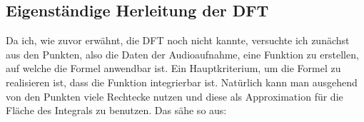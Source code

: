 \documentclass[a4paper,12pt]{article}
\theoremstyle{definition}
\theoremstyle{remark}
\begin{document}
\subsection{Eigenständige Herleitung der DFT}
Da ich, wie zuvor erwähnt, die DFT noch nicht kannte, versuchte ich zunächst aus den Punkten, 
also die Daten der Audioaufnahme, eine Funktion zu erstellen, auf welche die Formel anwendbar 
ist. Ein Hauptkriterium, um die Formel zu realisieren ist, dass die Funktion integrierbar ist. 
Natürlich kann man ausgehend von den Punkten viele Rechtecke nutzen und diese als Approximation 
für die Fläche des Integrals zu benutzen. Das sähe so aus:

\begin{figure}[h!]
\centering
{}
  \end{figure}
\end{document}
